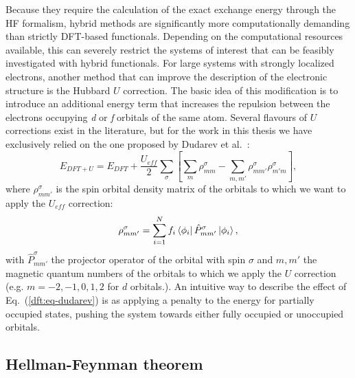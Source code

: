 \begin{refsection}
 \label{dft:sec-dudarev} 
Because they require the calculation of the exact exchange energy through the 
HF formalism, hybrid methods are significantly more computationally demanding 
than strictly DFT-based functionals. Depending on the computational resources 
available, this can severely restrict the systems of interest that can be 
feasibly investigated with hybrid functionals. For large systems with strongly 
localized electrons, another method that can improve the description of the 
electronic structure is the Hubbard $U$ correction. The basic idea of this 
modification is to introduce an additional energy term that increases the 
repulsion between the electrons occupying \textit{d} or \textit{f} orbitals of 
the same atom. Several flavours of $U$ corrections exist in the literature, 
but for the work in this thesis we have exclusively relied on the one proposed 
by Dudarev et al.~\cite{Dudarev1998}: 
\begin{equation}\label{dft:eq-dudarev} 
E_{DFT+U} = E_{DFT} + \frac{U_{eff}}{2} \sum_\sigma \left[ \sum_m 
\rho_{mm}^\sigma - \sum_{m, m'} \rho_{mm'}^\sigma\rho_{m'm}^\sigma\right], 
\end{equation} 
where $\rho^\sigma_{mm'}$ is the spin orbital density matrix of the orbitals to which we 
want to apply the $U_{eff}$ correction:
\begin{equation}
\rho^\sigma_{mm'} = \sum_{i=1}^N f_i \bra{\phi_i} \hat{P}_{mm'}^\sigma \ket{\phi_i},
\end{equation}
with $\hat{P}_{mm'}^\sigma$ the projector operator of the orbital with spin 
$\sigma$ and $m, m'$ the magnetic quantum numbers of the orbitals 
to which we apply the $U$ correction (e.g. $m=-2, -1, 0, 1, 2$ for $d$ 
orbitals.). An intuitive way to describe the effect of 
Eq.~(\ref{dft:eq-dudarev}) is as applying a penalty to the energy for partially 
occupied states, pushing the system towards either fully occupied or 
unoccupied orbitals. 

\subsection{Hellman-Feynman theorem} \label{dft:sec-hellmann} 
 

\end{refsection}
